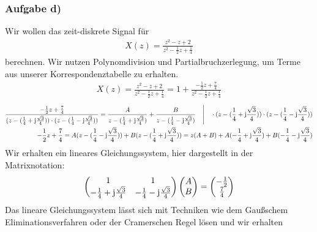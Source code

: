 \documentclass[11pt,a4paper,DIV=12]{scrartcl}
\begin{document}
\subsubsection{Aufgabe d)}
Wir wollen das zeit-diskrete Signal für
\begin{align}
	X(z)=\frac{z^2-z+2}{z^2-\frac{1}{2}z+\frac{1}{4}}
\end{align}
berechnen.
Wir nutzen Polynomdivision und Partialbruchzerlegung, um Terme aus unserer Korrespondenztabelle zu erhalten.
\begin{align}
	X(z)=\frac{z^2-z+2}{z^2-\frac{1}{2}z+\frac{1}{4}}=1+\frac{-\frac{1}{2}z+\frac{7}{4}}{z^2-\frac{1}{2}z+\frac{1}{4}}
\end{align}
\begin{align}
	\label{eq:TaskDPartialFractionDecomposition}
	\frac{-\frac{1}{2}z+\frac{7}{4}}{(z-(\frac{1}{4}+\im\frac{\sqrt{3}}{4}))\cdot(z-(\frac{1}{4}-\im\frac{\sqrt{3}}{4}))}=\frac{A}{z-(\frac{1}{4}+\im\frac{\sqrt{3}}{4})}+\frac{B}{z-(\frac{1}{4}-\im\frac{\sqrt{3}}{4})}\quad\Bigg | \quad \cdot (z-(\frac{1}{4}+\im\frac{\sqrt{3}}{4}))\cdot(z-(\frac{1}{4}-\im\frac{\sqrt{3}}{4}))\nonumber\\
	-\frac{1}{2}z+\frac{7}{4}=A(z-(\frac{1}{4}-\im\frac{\sqrt{3}}{4}))+B(z-(\frac{1}{4}+\im\frac{\sqrt{3}}{4}))=z(A+B)+A(-\frac{1}{4}+\im\frac{\sqrt{3}}{4})+B(-\frac{1}{4}-\im\frac{\sqrt{3}}{4})
\end{align}
Wir erhalten ein lineares Gleichungssystem, hier dargestellt in der Matrixnotation:
\begin{align}
	\begin{pmatrix}
		1 & 1 \\
		-\frac{1}{4}+\im\frac{\sqrt{3}}{4} & -\frac{1}{4}-\im\frac{\sqrt{3}}{4}
	\end{pmatrix}
	\begin{pmatrix}
		A \\
		B
	\end{pmatrix}
	=
	\begin{pmatrix}
		-\frac{1}{2} \\
		\frac{7}{4}
	\end{pmatrix}
\end{align}
Das lineare Gleichungssystem lässt sich mit Techniken wie dem Gaußschem Eliminationsverfahren oder der Cramerschen Regel lösen und wir erhalten
\end{document}
